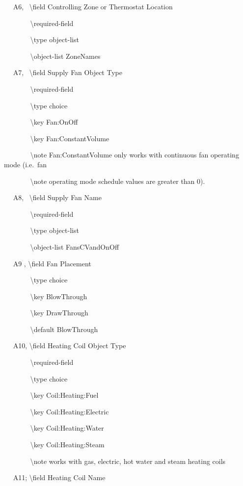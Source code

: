 ~~ A6,~ \textbackslash{}field Controlling Zone or Thermostat Location

~~~~~~~ \textbackslash{}required-field

~~~~~~~ \textbackslash{}type object-list

~~~~~~~ \textbackslash{}object-list ZoneNames

~~ A7,~ \textbackslash{}field Supply Fan Object Type

~~~~~~~ \textbackslash{}required-field

~~~~~~~ \textbackslash{}type choice

~~~~~~~ \textbackslash{}key Fan:OnOff

~~~~~~~ \textbackslash{}key Fan:ConstantVolume

~~~~~~~ \textbackslash{}note Fan:ConstantVolume only works with continuous fan operating mode (i.e.~fan

~~~~~~~ \textbackslash{}note operating mode schedule values are greater than 0).

~~ A8,~ \textbackslash{}field Supply Fan Name

~~~~~~~ \textbackslash{}required-field

~~~~~~~ \textbackslash{}type object-list

~~~~~~~ \textbackslash{}object-list FansCVandOnOff

~~ A9 , \textbackslash{}field Fan Placement

~~~~~~~ \textbackslash{}type choice

~~~~~~~ \textbackslash{}key BlowThrough

~~~~~~~ \textbackslash{}key DrawThrough

~~~~~~~ \textbackslash{}default BlowThrough

~~ A10, \textbackslash{}field Heating Coil Object Type

~~~~~~~ \textbackslash{}required-field

~~~~~~~ \textbackslash{}type choice

~~~~~~~ \textbackslash{}key Coil:Heating:Fuel

~~~~~~~ \textbackslash{}key Coil:Heating:Electric

~~~~~~~ \textbackslash{}key Coil:Heating:Water

~~~~~~~ \textbackslash{}key Coil:Heating:Steam

~~~~~~~ \textbackslash{}note works with gas, electric, hot water and steam heating coils

~~ A11; \textbackslash{}field Heating Coil Name

